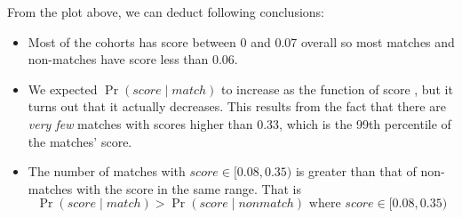 From the plot above, we can deduct following conclusions:
\begin{itemize}
\item Most of the cohorts has score between 0 and 0.07 overall so most matches
and non-matches have score less than 0.06.
\item We expected $\Pr{(score \mid match)}$ to increase as the function of score
, but it turns out that it actually decreases. This results from the fact that
there are \emph{very few} matches with scores higher than 0.33, which is the 99th
percentile of the matches' score.
\item The number of matches with $score \in [0.08, 0.35)$ is greater than that of
non-matches with the score in the same range. That is
$$\Pr{(score \mid match)} > \Pr{(score \mid nonmatch)} \mbox{ where } score\in [0.08, 0.35)$$
\end{itemize}


